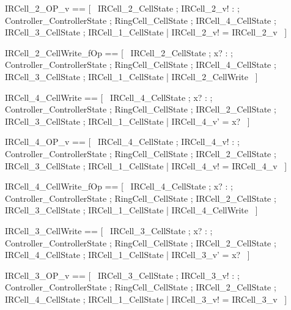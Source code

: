 \documentclass{article}
\begin{document}
\begin{zed}
	IRCell\_2\_OP\_v == [~  \Xi IRCell\_2\_CellState ; IRCell\_2\_v! : \nat ; \Xi Controller\_ControllerState ; \Xi RingCell\_CellState ; \Xi IRCell\_4\_CellState ; \Xi IRCell\_3\_CellState ; \Xi IRCell\_1\_CellState | IRCell\_2\_v! = IRCell\_2\_v  ~]
\end{zed}

\begin{zed}
	IRCell\_2\_CellWrite\_fOp == [~  \Xi IRCell\_2\_CellState ; x? : \nat ; \Xi Controller\_ControllerState ; \Xi RingCell\_CellState ; \Xi IRCell\_4\_CellState ; \Xi IRCell\_3\_CellState ; \Xi IRCell\_1\_CellState | \lnot \pre IRCell\_2\_CellWrite  ~]
\end{zed}

\begin{zed}
	IRCell\_4\_CellWrite == [~  \Delta IRCell\_4\_CellState ; x? : \nat ; \Xi Controller\_ControllerState ; \Xi RingCell\_CellState ; \Xi IRCell\_2\_CellState ; \Xi IRCell\_3\_CellState ; \Xi IRCell\_1\_CellState | IRCell\_4\_v' = x?  ~]
\end{zed}

\begin{zed}
	IRCell\_4\_OP\_v == [~  \Xi IRCell\_4\_CellState ; IRCell\_4\_v! : \nat ; \Xi Controller\_ControllerState ; \Xi RingCell\_CellState ; \Xi IRCell\_2\_CellState ; \Xi IRCell\_3\_CellState ; \Xi IRCell\_1\_CellState | IRCell\_4\_v! = IRCell\_4\_v  ~]
\end{zed}

\begin{zed}
	IRCell\_4\_CellWrite\_fOp == [~  \Xi IRCell\_4\_CellState ; x? : \nat ; \Xi Controller\_ControllerState ; \Xi RingCell\_CellState ; \Xi IRCell\_2\_CellState ; \Xi IRCell\_3\_CellState ; \Xi IRCell\_1\_CellState | \lnot \pre IRCell\_4\_CellWrite  ~]
\end{zed}

\begin{zed}
	IRCell\_3\_CellWrite == [~  \Delta IRCell\_3\_CellState ; x? : \nat ; \Xi Controller\_ControllerState ; \Xi RingCell\_CellState ; \Xi IRCell\_2\_CellState ; \Xi IRCell\_4\_CellState ; \Xi IRCell\_1\_CellState | IRCell\_3\_v' = x?  ~]
\end{zed}

\begin{zed}
	IRCell\_3\_OP\_v == [~  \Xi IRCell\_3\_CellState ; IRCell\_3\_v! : \nat ; \Xi Controller\_ControllerState ; \Xi RingCell\_CellState ; \Xi IRCell\_2\_CellState ; \Xi IRCell\_4\_CellState ; \Xi IRCell\_1\_CellState | IRCell\_3\_v! = IRCell\_3\_v  ~]
\end{zed}
\end{document}
